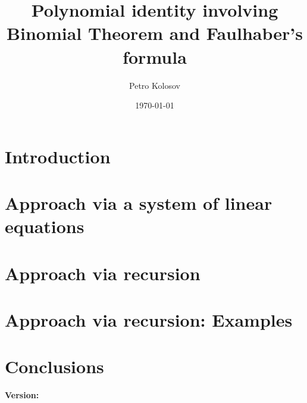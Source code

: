 \documentclass[12pt,letterpaper,oneside,reqno]{amsart}
\title[Polynomial identity involving Binomial Theorem and Faulhaber's formula]
{Polynomial identity involving Binomial Theorem and Faulhaber's formula}
\author[Petro Kolosov]{Petro Kolosov}
\date{\today}
\numberwithin{equation}{section}
\begin{document}
    \begin{abstract}
        
    \end{abstract}

    \maketitle

    \tableofcontents


    \section{Introduction}\label{sec:introduction}
    


    \section{Approach via a system of linear equations}\label{sec:approach-via-system-of-linear-equations}
    
    
    
    
    


    \section{Approach via recursion}\label{sec:approach-via-recursion}
    


    \section{Approach via recursion: Examples}\label{sec:approach-via-recursion:-examples}
    
    
    
    
    


    \section{Conclusions}\label{sec:conclusions}
    

    
    
    \noindent \textbf{Version:} 
\end{document}
